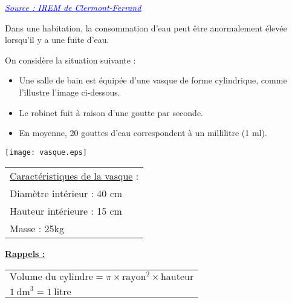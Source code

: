 
\hrulefill\par
\href{http://www.irem.univ-bpclermont.fr/IMG/pdf/iremrectoratclermontferrandlafuite.pdf}{\textcolor{blue}{\underline{\textit{Source : IREM de Clermont-Ferrand}}}}
\par\hrulefill
\medskip

Dans une habitation, la consommation d'eau peut être anormalement élevée lorsqu'il y a une fuite d'eau.

On considère la situation suivante :
\begin{itemize}[label=$\bullet$]
    \item Une salle de bain est équipée d'une vasque de forme cylindrique, comme l'illustre l'image ci-dessous.
    \item Le robinet fuit à raison d'une goutte par seconde.
    \item En moyenne, 20 gouttes d'eau correspondent à un millilitre (1 ml).
\end{itemize}

\begin{minipage}{7cm}
\texttt{[image: vasque.eps]}
\end{minipage}
\begin{minipage}{12cm}
\renewcommand{\arraystretch}{1.5}
\begin{tabular}{|p{8cm}|}
\hline
    \underline{Caractéristiques de la vasque} :\\
    \hspace{1.5cm} Diamètre intérieur : 40 cm  \\
    \hspace{1.5cm} Hauteur intérieure : 15 cm  \\
    \hspace{1.5cm} Masse : 25kg  \\
\hline 
\end{tabular}
\end{minipage}
\par\vspace{1cm}
\textbf{\underline{Rappels :}} \hspace{2cm}
\renewcommand{\arraystretch}{2}
\begin{tabular}{|>{\centering\arraybackslash}p{8cm}|}
\hline
$\text{Volume du cylindre} = \pi \times \text{rayon}^2 \times \text{hauteur}$\\
$1~\text{dm}^3 = 1~\text{litre}$\\
\hline 
\end{tabular}

\renewcommand{\arraystretch}{1}

